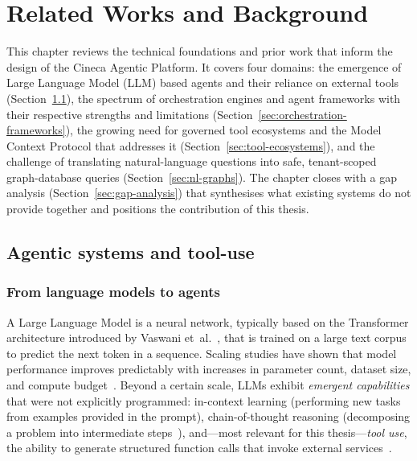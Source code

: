 \documentclass[a4paper]{sapthesis}
\begin{document}

\chapter{Related Works and Background}
\label{ch:background}

This chapter reviews the technical foundations and prior work that inform the
design of the Cineca Agentic Platform.  It covers four domains: the emergence
of Large Language Model (LLM) based agents and their reliance on external
tools (Section~\ref{sec:agentic-systems}), the spectrum of orchestration
engines and agent frameworks with their respective strengths and limitations
(Section~\ref{sec:orchestration-frameworks}), the growing need for governed
tool ecosystems and the Model Context Protocol that addresses it
(Section~\ref{sec:tool-ecosystems}), and the challenge of translating
natural-language questions into safe, tenant-scoped graph-database queries
(Section~\ref{sec:nl-graphs}).  The chapter closes with a gap analysis
(Section~\ref{sec:gap-analysis}) that synthesises what existing systems do
not provide together and positions the contribution of this thesis.

\section{Agentic systems and tool-use}
\label{sec:agentic-systems}

\subsection{From language models to agents}

A Large Language Model is a neural network, typically based on the
Transformer architecture introduced by Vaswani et~al.~\cite{vaswani2017attention},
that is trained on a large text corpus to predict the next token in a
sequence.  Scaling studies have shown that model performance improves
predictably with increases in parameter count, dataset size, and compute
budget~\cite{kaplan2020scaling}.  Beyond a certain scale, LLMs exhibit
\emph{emergent capabilities} that were not explicitly programmed: in-context
learning (performing new tasks from examples provided in the prompt),
chain-of-thought reasoning (decomposing a problem into intermediate
steps~\cite{wei2022chain}), and---most relevant for this
thesis---\emph{tool use}, the ability to generate structured function calls
that invoke external services~\cite{schick2023toolformer}.
\end{document}
